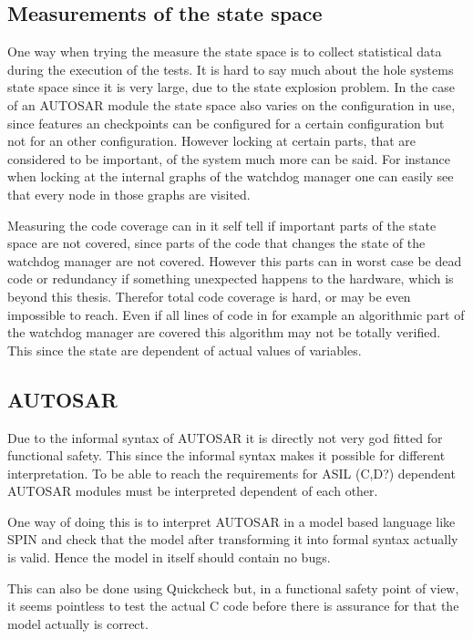 \subsection{Measurements of the state space}
One way when trying the measure the state space is to collect statistical data
during the execution of the tests. It is hard to say much about the hole systems
state space since it is very large, due to the state explosion problem. In the
case of an AUTOSAR module the state space also varies on the configuration in
use, since features an checkpoints can be configured for a certain configuration
but not for an other configuration.
However locking at certain parts, that are considered to be important, of the system
much more can be said. For instance when locking at the internal graphs of the
watchdog manager one can easily see that every node in those graphs are visited.

Measuring the code coverage can in it self tell if important parts of the state
space are not covered, since parts of the code that changes the state of the
watchdog manager are not covered. However this parts can in worst case be dead
code or redundancy if something unexpected happens to the hardware, which is
beyond this thesis. Therefor total code coverage is hard, or may be even
impossible to reach.  Even if all lines of code in for example an algorithmic
part of the watchdog manager are covered this algorithm may not be totally
verified. This since the state are dependent of actual values of
variables.

\subsection{AUTOSAR}
Due to the informal syntax of AUTOSAR it is directly not very god fitted for
functional safety. This since the informal syntax makes it possible for
different interpretation. To be able to reach the requirements for ASIL (C,D?)
dependent AUTOSAR modules must be interpreted dependent of each other.

One way of doing this is to interpret AUTOSAR in a model based language like
SPIN and check that the model after transforming it into formal syntax actually
is valid. Hence the model in itself should contain no bugs.

This can also be done using Quickcheck but, in a functional safety point of
view, it seems pointless to test the actual C code before there is assurance for
that the model actually is correct.

